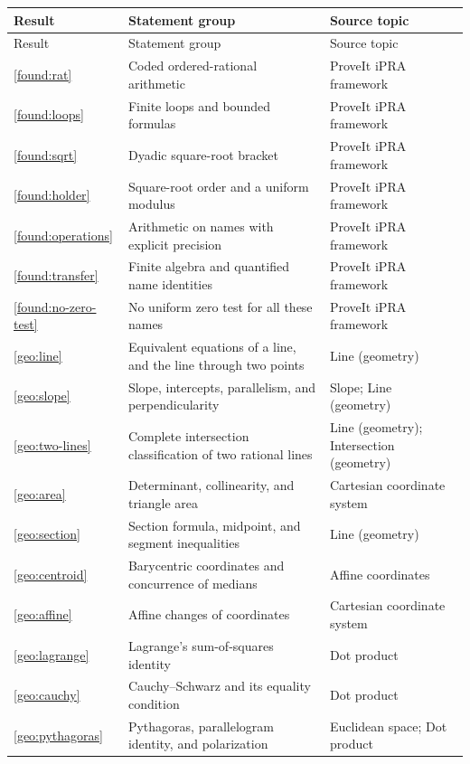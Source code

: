 \small
\begin{longtable}{p{.08\linewidth}p{.55\linewidth}p{.28\linewidth}}
\toprule Result & Statement group & Source topic \\ \midrule
\endfirsthead
\toprule Result & Statement group & Source topic \\ \midrule
\endhead
\bottomrule\endfoot
\ref{found:rat} & Coded ordered-rational arithmetic & ProveIt iPRA framework \\
\ref{found:loops} & Finite loops and bounded formulas & ProveIt iPRA framework \\
\ref{found:sqrt} & Dyadic square-root bracket & ProveIt iPRA framework \\
\ref{found:holder} & Square-root order and a uniform modulus & ProveIt iPRA framework \\
\ref{found:operations} & Arithmetic on names with explicit precision & ProveIt iPRA framework \\
\ref{found:transfer} & Finite algebra and quantified name identities & ProveIt iPRA framework \\
\ref{found:no-zero-test} & No uniform zero test for all these names & ProveIt iPRA framework \\
\ref{geo:line} & Equivalent equations of a line, and the line through two points & Line (geometry) \\
\ref{geo:slope} & Slope, intercepts, parallelism, and perpendicularity & Slope; Line (geometry) \\
\ref{geo:two-lines} & Complete intersection classification of two rational lines & Line (geometry); Intersection (geometry) \\
\ref{geo:area} & Determinant, collinearity, and triangle area & Cartesian coordinate system \\
\ref{geo:section} & Section formula, midpoint, and segment inequalities & Line (geometry) \\
\ref{geo:centroid} & Barycentric coordinates and concurrence of medians & Affine coordinates \\
\ref{geo:affine} & Affine changes of coordinates & Cartesian coordinate system \\
\ref{geo:lagrange} & Lagrange's sum-of-squares identity & Dot product \\
\ref{geo:cauchy} & Cauchy--Schwarz and its equality condition & Dot product \\
\ref{geo:pythagoras} & Pythagoras, parallelogram identity, and polarization & Euclidean space; Dot product \\

\end{longtable}
